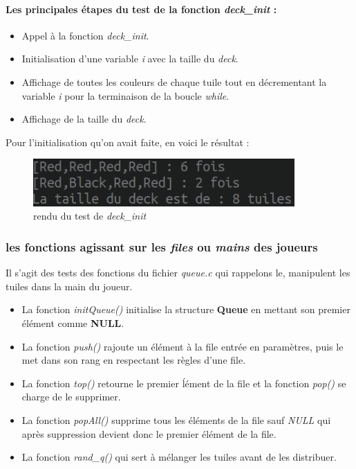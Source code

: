 \documentclass[12pt,a4paper]{extarticle}
\begin{document}
    \paragraph{Les principales \'etapes du test de la fonction \emph{deck\_init} :}
    \begin{itemize}
        \item Appel \`a la fonction \emph{deck\_init}.
        \item Initialisation d'une variable \emph{i} avec la taille du \emph{deck}.
        \item Affichage de toutes les couleurs de chaque tuile tout en d\'ecrementant la variable \emph{i}
        pour la terminaison de la boucle \emph{while}.
        \item Affichage de la taille du \emph{deck}.
    \end{itemize}

    Pour l'initialisation qu'on avait faite, en voici le r\'esultat : 
    \begin{figure}[h!]
        \centering
        \includegraphics[width = 10cm]{img/deckinitc}
        \caption{rendu du test de \emph{deck\_init}}
    \end{figure}
    \subsubsection{les fonctions agissant sur les \emph{files} ou \emph{mains} des joueurs}
    Il s'agit des tests des fonctions du fichier \emph{queue.c} qui rappelons le, manipulent
    les tuiles dans la main du joueur.
    \begin{itemize}
        \item La fonction \emph{initQueue()} initialise la structure \textbf{Queue} en mettant son premier
         \'el\'ement comme \textbf{NULL}.
        \item La fonction \emph{push()} rajoute un \'el\'ement \`a la file entr\'ee en param\`etres, puis le
        met dans son rang en respectant les r\`egles d'une file.
        \item La fonction \emph{top()} retourne le premier \'l\'ement de la file et la fonction \emph{pop()} 
        se charge de le supprimer.
        \item La fonction \emph{popAll()} supprime tous les \'el\'ements de la file sauf \emph{NULL}
        qui apr\`es suppression devient donc le premier \'el\'ement de la file.
        \item La fonction \emph{rand\_q()} qui sert \`a m\'elanger les tuiles avant de les distribuer.
    \end{itemize}
\end{document}
